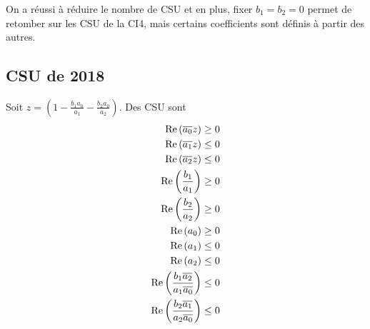   On a réussi à réduire le nombre de CSU et en plus, fixer \(b_1=b_2=0\) permet de retomber sur les CSU de la CI4, mais certains coefficients sont définis à partir des autres.

\subsection{CSU de 2018}

  \begin{prop}
    Soit \(z = \left(1 - \frac{b_1a_0}{a_1} - \frac{b_2a_0}{a_2}\right) \). Des CSU sont
    \begin{align}
      \operatorname{Re}\left({\overline{a_0}}z\right) \ge 0
      \\
      \operatorname{Re}\left({\overline{a_1}}z\right) \le 0
      \\
      \operatorname{Re}\left({\overline{a_2}}z\right) \le 0
      \\
      \operatorname{Re}\left(\dfrac{b_1}{a_1}\right) \ge 0
      \\
      \operatorname{Re}\left(\dfrac{b_2}{a_2}\right) \ge 0
      \\
      \operatorname{Re}\left(a_0\right) \ge 0
      \\
      \operatorname{Re}\left(a_1\right) \le 0
      \\
      \operatorname{Re}\left(a_2\right) \le 0
      \\
      \operatorname{Re}\left(\dfrac{b_1{\overline{a_2}}}{a_1{\overline{a_0}}}\right) \le 0
      \\
      \operatorname{Re}\left(\dfrac{b_2{\overline{a_1}}}{a_2{\overline{a_0}}}\right) \le 0
    \end{align}
  \end{prop}
